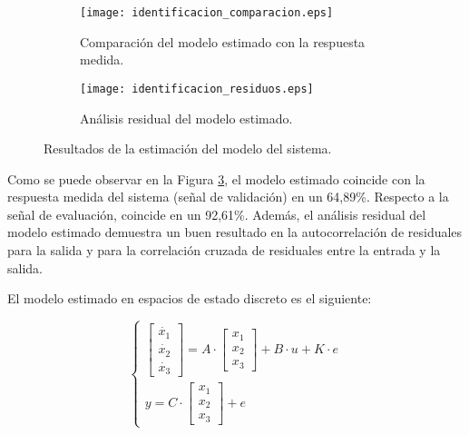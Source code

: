 \begin{figure}[H]
    \centering

    \begin{subfigure}[b]{\textwidth}
        \centering
        \texttt{[image: identificacion\_comparacion.eps]}
        \caption{Comparación del modelo estimado con la respuesta medida.}
        \vspace{0.25cm}
        \label{fig:identificacion_comparacio n}
    \end{subfigure}
    \begin{subfigure}[b]{\textwidth}
        \centering
        \texttt{[image: identificacion\_residuos.eps]}
        \caption{Análisis residual del modelo estimado.}
        \label{fig:identificacion_residuos}
    \end{subfigure}

    \vspace{-0.25cm}
    \caption{Resultados de la estimación del modelo del sistema.}
    \label{fig:identificacion_resultados}
\end{figure}
\vspace{-0.5cm}

Como se puede observar en la Figura \ref{fig:identificacion_resultados}, el modelo estimado coincide
con la respuesta medida del sistema (señal de validación) en un 64,89\%. Respecto a la señal de 
evaluación, coincide en un 92,61\%. Además, el análisis residual del modelo estimado
demuestra un buen resultado en la autocorrelación de residuales para la salida y para la correlación
cruzada de residuales entre la entrada y la salida.

El modelo estimado en espacios de estado discreto es el siguiente:

\vspace{-0.5cm}
\begin{equation}
    \begin{cases}
        \begin{bmatrix}
            \dot{x_1}   \\
            \dot{x_2}   \\
            \dot{x_3}
        \end{bmatrix}
        =
        A
        \cdot
        \begin{bmatrix}
            x_1 \\
            x_2 \\
            x_3
        \end{bmatrix}
        +
        B
        \cdot
        u 
        +
        K
        \cdot
        e
        \\
        y =
        C
        \cdot
        \begin{bmatrix}
            x_1 \\
            x_2 \\
            x_3
        \end{bmatrix}
        +
        e

    \end{cases}
\end{equation}

